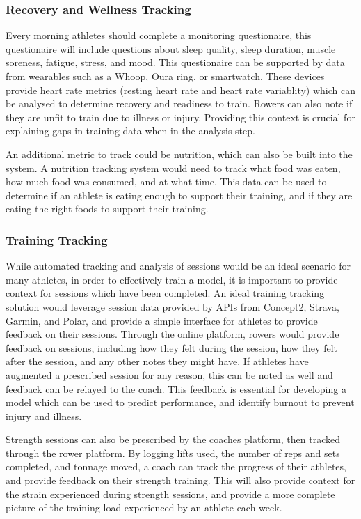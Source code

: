 \subsubsection{Recovery and Wellness Tracking}
Every morning athletes should complete a monitoring questionaire, this questionaire will include questions about sleep quality, sleep duration, muscle soreness, fatigue, stress, and mood. This questionaire can be supported by data from wearables such as a Whoop, Oura ring, or smartwatch. These devices provide heart rate metrics (resting heart rate and heart rate variablity) which can be analysed to determine recovery and readiness to train. Rowers can also note if they are unfit to train due to illness or injury. Providing this context is crucial for explaining gaps in training data when in the analysis step.

An additional metric to track could be nutrition, which can also be built into the system. A nutrition tracking system would need to track what food was eaten, how much food was consumed, and at what time. This data can be used to determine if an athlete is eating enough to support their training, and if they are eating the right foods to support their training.

\subsubsection{Training Tracking}
While automated tracking and analysis of sessions would be an ideal scenario for many athletes, in order to effectively train a model, it is important to provide context for sessions which have been completed. An ideal training tracking solution would leverage session data provided by APIs from Concept2, Strava, Garmin, and Polar, and provide a simple interface for athletes to provide feedback on their sessions. Through the online platform, rowers would provide feedback on sessions, including how they felt during the session, how they felt after the session, and any other notes they might have. If athletes have augmented a prescribed session for any reason, this can be noted as well and feedback can be relayed to the coach. This feedback is essential for developing a model which can be used to predict performance, and identify burnout to prevent injury and illness.

Strength sessions can also be prescribed by the coaches platform, then tracked through the rower platform. By logging lifts used, the number of reps and sets completed, and tonnage moved, a coach can track the progress of their athletes, and provide feedback on their strength training. This will also provide context for the strain experienced during strength sessions, and provide a more complete picture of the training load experienced by an athlete each week.

